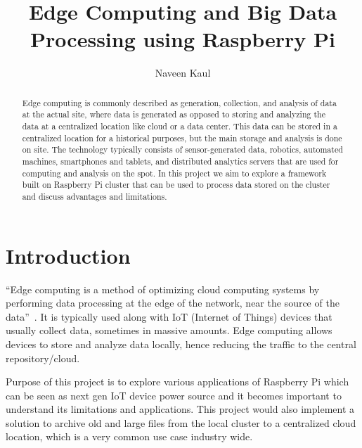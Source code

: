 
\title{Edge Computing and Big Data Processing using Raspberry Pi}


\author{Naveen Kaul}

\renewcommand{\shortauthors}{N. Kaul}


\begin{abstract}
Edge computing is commonly described as generation, collection, and
analysis of data at the actual site, where data is generated as
opposed to storing and analyzing the data at a centralized location
like cloud or a data center. This data can be stored in a centralized
location for a historical purposes, but the main storage and analysis
is done on site. The technology typically consists of sensor-generated
data, robotics, automated machines, smartphones and tablets, and
distributed analytics servers that are used for computing and analysis
on the spot. In this project we aim to explore a framework built on
Raspberry Pi cluster that can be used to process data stored on the cluster and discuss advantages and limitations. 
\end{abstract}



\maketitle

\section{Introduction}
``Edge computing is a method of optimizing cloud computing systems by performing data processing at the edge of the network, near the source of the data''~\cite{hid-sp18-510-edge-wiki}. It is typically used along with IoT (Internet of Things) devices that usually collect data, sometimes in massive amounts. Edge computing allows devices to store and analyze data locally, hence reducing the traffic to the central repository/cloud.

Purpose of this project is to explore various applications of Raspberry Pi which can be seen as next gen IoT device power source and it becomes important to understand its limitations and applications. This project would also implement a solution to archive old and large files from the local cluster to a centralized cloud location, which is a very common use case industry wide.

